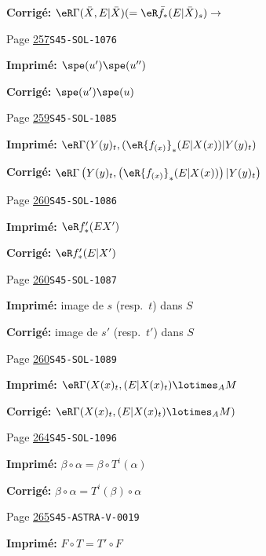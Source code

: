 \begin{description}
\par\noindent\textbf{Corrigé:} \(\eR\Gamma(\bar X,E|\bar X) (=\eR\bar f_\ast (E|\bar X)_s) \to\)
\smallskip
\item[\hypertarget{apparatus:FR-0268}{268}] Page \hyperlink{printpage:fr:257}{257}\quad\texttt{S45-SOL-1076}
\par\noindent\textbf{Imprimé:} \(\spe(u')\spe(u'')\)
\par\noindent\textbf{Corrigé:} \(\spe(u')\spe(u)\)
\smallskip
\item[\hypertarget{apparatus:FR-0269}{269}] Page \hyperlink{printpage:fr:259}{259}\quad\texttt{S45-SOL-1085}
\par\noindent\textbf{Imprimé:} \(\eR\Gamma(Y(y)_t,(\eR {f_{(x)}}_\ast (E|X(x))|Y(y)_t)\)
\par\noindent\textbf{Corrigé:} \(\eR\Gamma\left(Y(y)_t,\left(\eR {f_{(x)}}_\ast (E|X(x))\right)|Y(y)_t\right)\)
\smallskip
\item[\hypertarget{apparatus:FR-0270}{270}] Page \hyperlink{printpage:fr:260}{260}\quad\texttt{S45-SOL-1086}
\par\noindent\textbf{Imprimé:} \(\eR f_\ast'(E X')\)
\par\noindent\textbf{Corrigé:} \(\eR f_\ast'(E|X')\)
\smallskip
\item[\hypertarget{apparatus:FR-0271}{271}] Page \hyperlink{printpage:fr:260}{260}\quad\texttt{S45-SOL-1087}
\par\noindent\textbf{Imprimé:} image de $s$ 
(resp.\ $t$) dans $S$
\par\noindent\textbf{Corrigé:} image de $s'$ 
(resp.\ $t'$) dans $S$
\smallskip
\item[\hypertarget{apparatus:FR-0272}{272}] Page \hyperlink{printpage:fr:260}{260}\quad\texttt{S45-SOL-1089}
\par\noindent\textbf{Imprimé:} \(\eR\Gamma(X(x)_t,(E|X(x)_t)\lotimes_A M\)
\par\noindent\textbf{Corrigé:} \(\eR\Gamma(X(x)_t,(E|X(x)_t)\lotimes_A M)\)
\smallskip
\item[\hypertarget{apparatus:FR-0273}{273}] Page \hyperlink{printpage:fr:264}{264}\quad\texttt{S45-SOL-1096}
\par\noindent\textbf{Imprimé:} \(\beta\circ \alpha = \beta\circ T^i(\alpha)\)
\par\noindent\textbf{Corrigé:} \(\beta\circ \alpha = T^i(\beta)\circ\alpha\)
\smallskip
\item[\hypertarget{apparatus:FR-0274}{274}] Page \hyperlink{printpage:fr:265}{265}\quad\texttt{S45-ASTRA-V-0019}
\par\noindent\textbf{Imprimé:} \(F\circ T = T'\circ F\)

\end{description}
